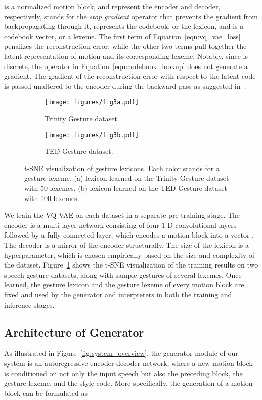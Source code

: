 \documentclass[acmtog,authorversion]{acmart}
\newcommand{\fig}{Figure{}~}
\newcommand{\eqn}{Equation{}~}
\begin{document}
 is a normalized motion block,  and  represent the encoder and decoder, respectively,  stands for the \emph{stop gradient} operator that prevents the gradient from backpropagating through it,  represents the codebook, or the lexicon, and  is a codebook vector, or a lexeme. The first term of \eqn\eqref{eqn:vq_vae_loss} penalizes the reconstruction error, while the other two terms pull together the latent representation of motion  and its corresponding lexeme. Notably, since  is discrete, the  operator in \eqn\eqref{eqn:codebook_lookup} does not generate a gradient. The gradient of the reconstruction error with respect to the latent code is passed unaltered to the encoder during the backward pass as suggested in~\cite{oord2017neural}.
\begin{figure}[t]
    \centering
    \begin{subfigure}[t]{0.47\linewidth}
        \centering
        \texttt{[image: figures/fig3a.pdf]}
        \caption{Trinity Gesture dataset.}
\end{subfigure}
    \hspace{\fill}
    \begin{subfigure}[t]{0.47\linewidth}
        \centering
        \texttt{[image: figures/fig3b.pdf]}
        \caption{TED Gesture dataset.}
\end{subfigure}
    \caption{t-SNE visualization of gesture lexicons. Each color stands for a gesture lexeme. (a) lexicon learned on the Trinity Gesture dataset with 50 lexemes. (b) lexicon learned on the TED Gesture dataset with 100 lexemes.}
    \Description{}
    \label{fig:gesture_lexicon}
\end{figure}

We train the VQ-VAE on each dataset in a separate pre-training stage. The encoder is a multi-layer network consisting of four 1-D convolutional layers followed by a fully connected layer, which encodes a motion block into a vector . The decoder is a mirror of the encoder structurally. The size of the lexicon is a hyperparameter, which is chosen empirically based on the size and complexity of the dataset. \fig\ref{fig:gesture_lexicon} shows the t-SNE visualization of the training results on two speech-gesture datasets, along with sample gestures of several lexemes. Once learned, the gesture lexicon and the gesture lexeme of every motion block are fixed and used by the generator and interpreters in both the training and inference stages.

\subsection{Architecture of Generator}
As illustrated in \fig\ref{fig:system_overview}, the generator module of our system is an autoregressive encoder-decoder network, where a new motion block is conditioned on not only the input speech but also the preceding block, the gesture lexeme, and the style code. More specifically, the generation of a motion block  can be formulated as
\end{document}
